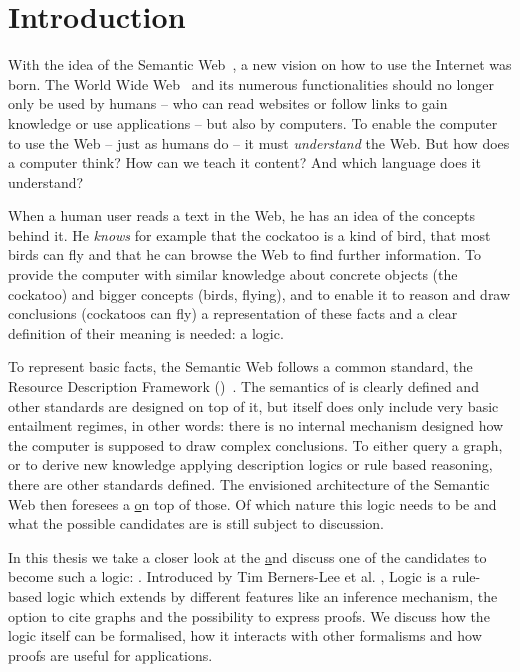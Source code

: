 \chapter{Introduction}
\setlength{\epigraphrule}{0pt}
\setlength{\epigraphwidth}{0.75\textwidth}

With the idea of the Semantic Web~\cite{SemanticWeb}, a new vision on how to use the Internet was born. The World Wide
Web~\cite{bernerslee_1992} and its numerous functionalities should no longer only be used by humans -- 
who can read websites or follow links to gain knowledge or use applications -- but also by computers. To enable the computer to use the Web -- just as humans do -- 
it must \emph{understand} the Web. But how does a computer think? How can we teach it content? 
And which language does it understand? 

When a human user reads a text in the Web, he has an idea of the concepts behind it. He \emph{knows} for example that the cockatoo is a kind of bird, that most birds can fly 
and that he
can browse the Web to find further information. To provide the computer with similar knowledge about concrete objects (the cockatoo) and bigger concepts (birds, flying),
and to enable it to reason and draw conclusions (cockatoos can fly) a representation of these facts and a clear definition of their meaning is needed: a logic.

To represent basic facts, the Semantic Web follows a common standard, the Resource Description Framework (\rdf)~\cite{rdf}. 
The semantics of \rdf is clearly defined and other standards are designed on top of it, 
but \rdf itself does only include very basic entailment regimes, in other words: there is no internal
mechanism designed how the computer is supposed to draw complex conclusions.
To either query a graph, or to derive new knowledge applying description logics
or rule based reasoning, there are other standards defined. The envisioned architecture of the Semantic Web then 
foresees a \ul on top of those. 
Of which nature this logic needs to be and what the possible candidates are is still subject to discussion. 

In this thesis we take a closer look at the \ul and 
discuss one of the candidates to become such a logic: 
\notationthree. 
Introduced by Tim Berners-Lee et al. \cite{N3Logic}, \notationthree Logic is a rule-based logic which extends \rdf
by different features like an inference mechanism, the option to cite graphs and the possibility to express proofs.
We discuss how the logic itself can be formalised, how it interacts with other formalisms and how proofs are useful for applications.



